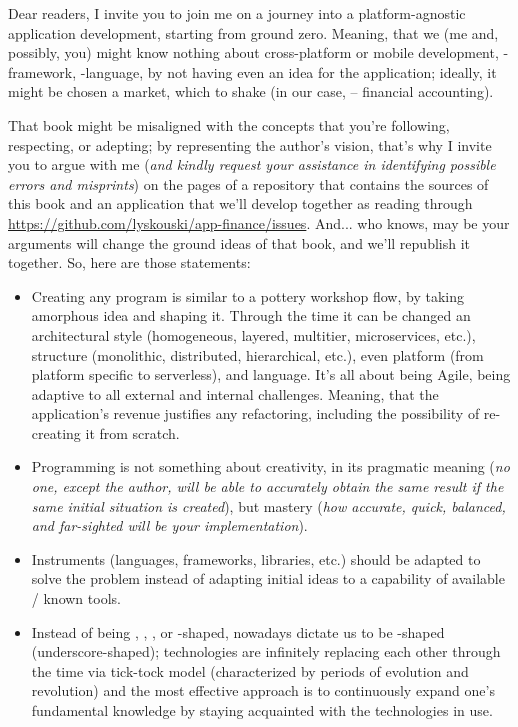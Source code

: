 
Dear readers, I invite you to join me on a journey into a platform-agnostic application development, starting from 
ground zero. Meaning, that we (me and, possibly, you) might know nothing about cross-platform or mobile development, 
-framework, -language, by not having even an idea for the application; ideally, it might 
be chosen a market, which to shake (in our case, -- financial accounting).

That book might be misaligned with the concepts that you're following, respecting, or adepting; by representing the 
author's vision, that's why I invite you to argue with me (\emph{and kindly request your assistance in identifying 
possible errors and misprints}) on the pages of a repository that contains the sources of this book and an application 
that we'll develop together as reading through 
\href{https://github.com/lyskouski/app-finance/issues}{https://github.com/lyskouski/app-finance/issues}. And... 
who knows, may be your arguments will change the ground ideas of that book, and we'll republish it together. 
So, here are those statements:

\begin{itemize}
    \item Creating any program is similar to a pottery workshop flow, by taking amorphous idea and shaping it. Through 
    the time it can be changed an architectural style (homogeneous, layered, multitier, microservices, etc.), structure 
    (monolithic, distributed, hierarchical, etc.), even platform (from platform specific to serverless), and language. 
    It's all about being Agile, being adaptive to all external and internal challenges. Meaning, that the application's 
    revenue justifies any refactoring, including the possibility of re-creating it from scratch.

    \item Programming is not something about creativity, in its pragmatic meaning (\emph{no one, except the author, 
    will be able to accurately obtain the same result if the same initial situation is created}), but mastery 
    (\emph{how accurate, quick, balanced, and far-sighted will be your implementation}).

    \item Instruments (languages, frameworks, libraries, etc.) should be adapted to solve the problem instead of 
    adapting initial ideas to a capability of available / known tools.

    \item Instead of being , , , or -shaped, nowadays dictate us to be \q{\_}-shaped 
    (underscore-shaped); technologies are infinitely replacing each other through the time via tick-tock model 
    (characterized by periods of evolution and revolution) and the most effective approach is to continuously expand 
    one's fundamental knowledge by staying acquainted with the technologies in use.
\end{itemize}

